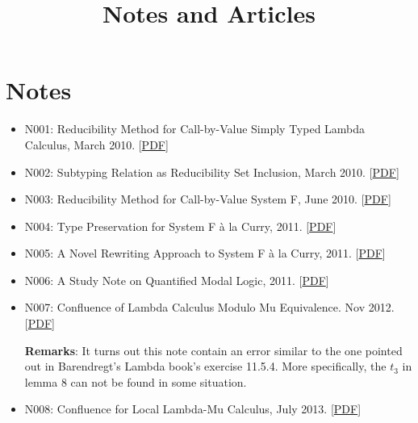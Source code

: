 \documentclass[10pt]{article}
\title{\bfseries\Large Notes and Articles}
\date{}
\begin{document}
\maketitle
\vspace{-4em}

\vspace{20pt}

\section*{Notes}
\begin{itemize}
\item N001: Reducibility Method for Call-by-Value Simply Typed Lambda Calculus, March 2010. [\href{../../document/notes/reducibility-stlc.pdf}{PDF}]

\item N002: Subtyping Relation as Reducibility Set Inclusion, March 2010. [\href{../../document/notes/subtyping-st.pdf}{PDF}]

\item N003: Reducibility Method for Call-by-Value System F, June 2010. [\href{../../document/notes/system-f-iii.pdf}{PDF}]

\item N004: Type Preservation for System F \`a la Curry, 2011. [\href{../../document/notes/systemf.pdf}{PDF}] 

\item N005: A Novel Rewriting Approach to System F \`a la Curry, 2011. [\href{../../document/notes/side-proj.pdf}{PDF}] 

\item N006: A Study Note on Quantified Modal Logic, 2011. [\href{../../document/notes/kripke-models.pdf}{PDF}]

\item N007: Confluence of Lambda Calculus Modulo Mu Equivalence. Nov 2012. [\href{../../document/notes/conf-lambda-mu-I.pdf}{PDF}]

\noindent  \textbf{Remarks}: It turns out this note contain an error similar to the one pointed out in Barendregt's Lambda book's exercise 11.5.4. More specifically, the $t_3$ in lemma 8 can not be found in some situation. 


\item N008: Confluence for Local Lambda-Mu Calculus, July 2013. [\href{../../document/notes/conf-lambda-mu-II.pdf}{PDF}]


\end{itemize}
\end{document}
